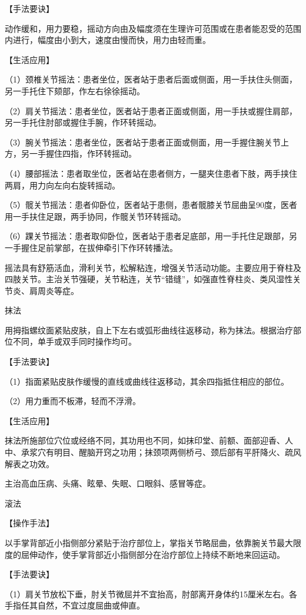 \documentclass[12pt,UTF8,openany]{ctexbook}
\begin{document}
【手法要诀】

动作缓和，用力要稳，摇动方向由及幅度须在生理许可范围或在患者能忍受的范围内进行，幅度由小到大，速度由慢而快，用力由轻而重。

【生活应用】

（1）颈椎关节摇法：患者坐位，医者站于患者后面或侧面，用一手扶住头侧面，另一手托住下颏部，作左右徐徐摇动。

（2）肩关节摇法：患者坐位，医者站于患者正面或侧面，用一手扶或握住肩部，另一手托住肘部或握住手腕，作环转摇动。

（3）腕关节摇法：患者坐位，医者站于患者正面或侧面，用一手握住腕关节上方，另一手握住四指，作环转摇动。

（4）腰部摇法：患者取坐位，医者站在患者侧方，一腿夹住患者下肢，两手挟住两肩，用力向左向右旋转摇动。

（5）髋关节摇法：患者仰卧位，医者站于患侧，患者髋膝关节屈曲呈90度，医者用一手扶住足跟，两手协同，作髋关节环转摇动。

（6）踝关节摇法：患者取仰卧位，医者站于患者足底部，用一手托住足跟部，另一手握住足前掌部，在拔伸牵引下作环转播法。

摇法具有舒筋活血，滑利关节，松解粘连，增强关节活动功能。主要应用于脊柱及四肢关节。主治关节强硬，关节粘连，关节“错缝”，如强直性脊柱炎、类风湿性关节炎、肩周炎等症。

抹法

用拇指螺纹面紧贴皮肤，自上下左右或弧形曲线往返移动，称为抹法。根据治疗部位不同，单手或双手同时操作均可。

【手法要诀】

（1）指面紧贴皮肤作缓慢的直线或曲线往返移动，其余四指抵住相应的部位。

（2）用力重而不板滞，轻而不浮滑。

【生活应用】

抹法所施部位穴位或经络不同，其功用也不同，如抹印堂、前额、面部迎香、人中、承浆穴有明目、醒脑开窍之功用；抹颈项两侧桥弓、颈后部有平肝降火、疏风解表之功效。

主治高血压病、头痛、眩晕、失眠、口眼斜、感冒等症。

滚法

【操作手法】

以手掌背部近小指侧部分紧贴于治疗部位上，掌指关节略屈曲，依靠腕关节最大限度的屈伸动作，使手掌背部近小指侧部分在治疗部位上持续不断地来回运动。

【手法要诀】

（1）肩关节放松下垂，肘关节微屈并不宜抬高，肘部离开身体约15厘米左右。各手指任其自然，不宜过度屈曲或伸直。
\end{document}
